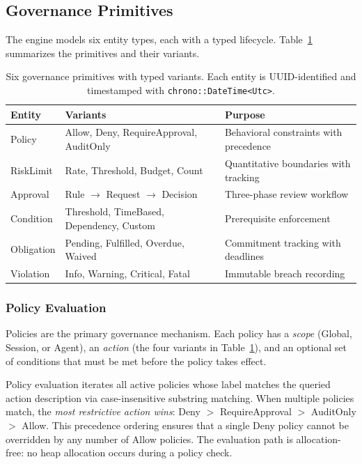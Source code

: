 \documentclass[10pt, twocolumn]{article}
\begin{document}
\subsection{Governance Primitives}
\label{sec:primitives}

The engine models six entity types, each with a typed lifecycle. Table~\ref{tab:primitives} summarizes the primitives and their variants.

\begin{table}[t]
\caption{Six governance primitives with typed variants. Each entity is UUID-identified and timestamped with \texttt{chrono::DateTime<Utc>}.}
\label{tab:primitives}
\centering
\scriptsize
\begin{tabular}{@{}lp{3cm}p{2.6cm}@{}}
\toprule
\textbf{Entity} & \textbf{Variants} & \textbf{Purpose} \\
\midrule
Policy & Allow, Deny, Require\-Approval, AuditOnly & Behavioral constraints with precedence \\
RiskLimit & Rate, Threshold, Budget, Count & Quantitative boundaries with tracking \\
Approval & Rule $\to$ Request $\to$ Decision & Three-phase review workflow \\
Condition & Threshold, TimeBased, Dependency, Custom & Prerequisite enforcement \\
Obligation & Pending, Fulfilled, Overdue, Waived & Commitment tracking with deadlines \\
Violation & Info, Warning, Critical, Fatal & Immutable breach recording \\
\bottomrule
\end{tabular}
\end{table}

\subsubsection{Policy Evaluation}

Policies are the primary governance mechanism. Each policy has a \emph{scope} (Global, Session, or Agent), an \emph{action} (the four variants in Table~\ref{tab:primitives}), and an optional set of conditions that must be met before the policy takes effect.

Policy evaluation iterates all active policies whose label matches the queried action description via case-insensitive substring matching. When multiple policies match, the \emph{most restrictive action wins}: Deny $>$ RequireApproval $>$ AuditOnly $>$ Allow. This precedence ordering ensures that a single Deny policy cannot be overridden by any number of Allow policies. The evaluation path is allocation-free: no heap allocation occurs during a policy check.
\end{document}
